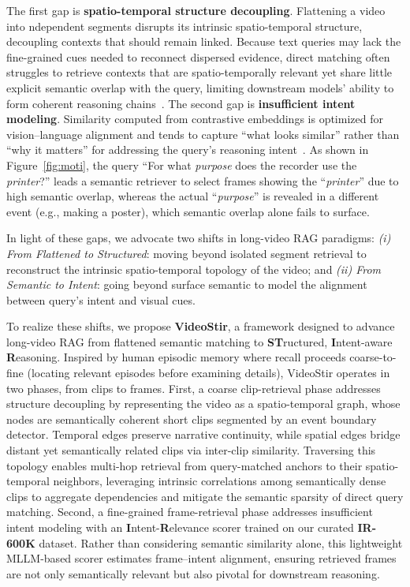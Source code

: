 The first gap is \textbf{spatio-temporal structure decoupling}. Flattening a video into ndependent segments disrupts its intrinsic spatio-temporal structure, decoupling contexts that should remain linked. Because text queries may lack the fine-grained cues needed to reconnect dispersed evidence, direct matching often struggles to retrieve contexts that are spatio-temporally relevant yet share little explicit semantic overlap with the query, limiting downstream models’ ability to form coherent reasoning chains~\cite{vgent,liao2024videoinsta}. The second gap is \textbf{insufficient intent modeling}. Similarity computed from contrastive embeddings is optimized for vision–language alignment and tends to capture ``what looks similar'' rather than ``why it matters'' for addressing the query’s reasoning intent~\cite{pan2024i3}. As shown in Figure~\ref{fig:moti}, the query ``For what \textit{purpose} does the recorder use the \textit{printer}?'' leads a semantic retriever to select frames showing the ``\textit{printer}'' due to high semantic overlap, whereas the actual ``\textit{purpose}'' is revealed in a different event (e.g., making a poster), which semantic overlap alone fails to surface.


In light of these gaps, we advocate two shifts in long-video RAG paradigms: \textit{(i) From Flattened to Structured}: moving beyond isolated segment retrieval to reconstruct the intrinsic spatio-temporal topology of the video; and \textit{(ii) From Semantic to Intent}: going beyond surface semantic to model the alignment between query's intent and visual cues.

{To realize these shifts, we propose \textbf{VideoStir}, a framework designed to advance long-video RAG from flattened semantic matching to \textbf{ST}ructured, \textbf{I}ntent-aware \textbf{R}easoning.} Inspired by human episodic memory where recall proceeds coarse-to-fine (locating relevant episodes before examining details), VideoStir operates in two phases, from clips to frames. First, a coarse clip-retrieval phase addresses structure decoupling by representing the video as a spatio-temporal graph, whose nodes are semantically coherent short clips segmented by an event boundary detector. Temporal edges preserve narrative continuity, while spatial edges bridge distant yet semantically related clips via inter-clip similarity. Traversing this topology enables multi-hop retrieval from query-matched anchors to their spatio-temporal neighbors, leveraging intrinsic correlations among semantically dense clips to aggregate dependencies and mitigate the semantic sparsity of direct query matching. Second, a fine-grained frame-retrieval phase addresses insufficient intent modeling with an \textbf{I}ntent-\textbf{R}elevance scorer trained on our curated \textbf{IR-600K} dataset. Rather than considering semantic similarity alone, this lightweight MLLM-based scorer estimates frame–intent alignment, ensuring retrieved frames are not only semantically relevant but also pivotal for downstream reasoning.


